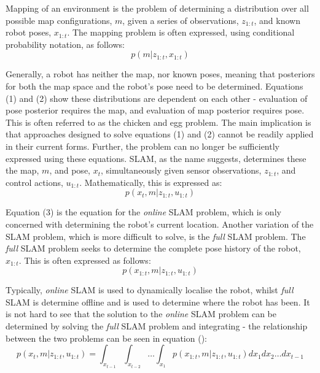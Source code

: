 \documentclass[a4paper]{article}
\begin{document}
Mapping of an environment is the problem of determining a distribution over all possible map configurations, $m$, given a series of observations, $z_{1:t}$, and known robot poses, $x_{1:t}$. The mapping problem is often expressed, using conditional probability notation, as follows:
\begin{equation}
p(m | z_{1:t}, x_{1:t})
\end{equation}

Generally, a robot has neither the map, nor known poses, meaning that posteriors for both the map space and the robot's pose need to be determined. Equations (1) and (2) show these distributions are dependent on each other - evaluation of pose posterior requires the map, and evaluation of map posterior requires pose. This is often referred to as the chicken and egg problem. The main implication is that approaches designed to solve equations (1) and (2) cannot be readily applied in their current forms. Further, the problem can no longer be sufficiently expressed using these equations. SLAM, as the name suggests, determines these the map, $m$, and pose, $x_t$, simultaneously given sensor observations, $z_{1:t}$, and control actions, $u_{1:t}$. Mathematically, this is expressed as:
\begin{equation}
p(x_t, m | z_{1:t}, u_{1:t})
\end{equation}

Equation (3) is the equation for the \textit{online} SLAM problem, which is only concerned with determining the robot's current location. Another variation of the SLAM problem, which is more difficult to solve, is the \textit{full} SLAM problem. The \textit{full} SLAM problem seeks to determine the complete pose history of the robot, $x_{1:t}$. This is often expressed as follows:
\begin{equation}
p(x_{1:t}, m | z_{1:t}, u_{1:t})
\end{equation}

Typically, \textit{online} SLAM is used to dynamically localise the robot, whilst \textit{full} SLAM is determine offline and is used to determine where the robot has been. It is not hard to see that the solution to the \textit{online} SLAM problem can be determined by solving the \textit{full} SLAM problem and integrating - the relationship between the two problems can be seen in equation ():
\begin{equation}
p(x_t, m | z_{1:t}, u_{1:t}) = \int_{x_{t-1}} \int_{x_{t-2}} \dots \int_{x_1} p(x_{1:t}, m | z_{1:t}, u_{1:t}) dx_1 dx_2 \dots dx_{t-1}
\end{equation}
\end{document}
